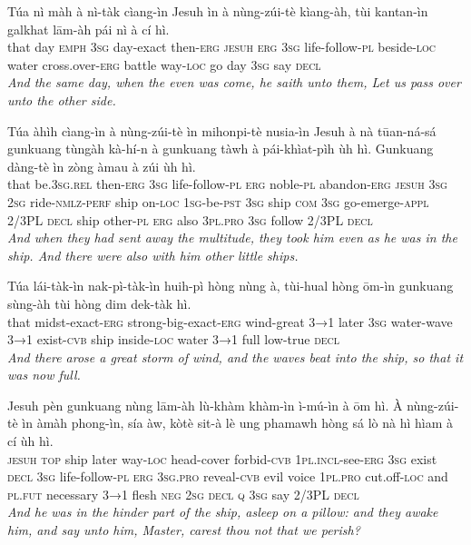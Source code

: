 \documentclass[11pt,a4paper]{article}
\begin{document}
\begin{exe}
\gll Túa nì màh à nì-tàk cìang-ìn Jesuh ìn à nùng-zúi-tè kìang-àh, tùi kantan-ìn galkhat lām-àh pái nì à cí hì. \\
     that day \textsc{emph} \textsc{3sg} day-exact then-\textsc{erg} \textsc{jesuh} \textsc{erg} \textsc{3sg} life-follow-\textsc{pl} beside-\textsc{loc} water cross.over-\textsc{erg} battle way-\textsc{loc} go day \textsc{3sg} say \textsc{decl} \\
\glt \textcolor{kjvcolor}{\textit{And the same day, when the even was come, he saith unto them, Let us pass over unto the other side.}}

\gll Túa àhìh cìang-ìn à nùng-zúi-tè ìn mihonpi-tè nusia-ìn Jesuh à nà tūan-ná-sá gunkuang tùngàh kà-hí-n à gunkuang tàwh à pái-khìat-pìh ùh hì. Gunkuang dàng-tè ìn zòng àmau à zúi ùh hì. \\
     that be.\textsc{3sg}.\textsc{rel} then-\textsc{erg} \textsc{3sg} life-follow-\textsc{pl} \textsc{erg} noble-\textsc{pl} abandon-\textsc{erg} \textsc{jesuh} \textsc{3sg} \textsc{2sg} ride-\textsc{nmlz}-\textsc{perf} ship on-\textsc{loc} \textsc{1sg}-be-\textsc{pst} \textsc{3sg} ship \textsc{com} \textsc{3sg} go-emerge-\textsc{appl} 2/3PL \textsc{decl} ship other-\textsc{pl} \textsc{erg} also \textsc{3pl}.\textsc{pro} \textsc{3sg} follow 2/3PL \textsc{decl} \\
\glt \textcolor{kjvcolor}{\textit{And when they had sent away the multitude, they took him even as he was in the ship. And there were also with him other little ships.}}

\gll Túa lái-tàk-ìn nak-pì-tàk-ìn huih-pì hòng nùng à, tùi-hual hòng ōm-ìn gunkuang sùng-àh tùi hòng dim dek-tàk hì. \\
     that midst-exact-\textsc{erg} strong-big-exact-\textsc{erg} wind-great \textsc{3→1} later \textsc{3sg} water-wave \textsc{3→1} exist-\textsc{cvb} ship inside-\textsc{loc} water \textsc{3→1} full low-true \textsc{decl} \\
\glt \textcolor{kjvcolor}{\textit{And there arose a great storm of wind, and the waves beat into the ship, so that it was now full.}}

\gll Jesuh pèn gunkuang nùng lām-àh lù-khàm khàm-ìn ì-mú-ìn à ōm hì. À nùng-zúi-tè ìn àmàh phong-ìn, sía àw, kòtè sit-à lè ung phamawh hòng sá lò nà hì hìam à cí ùh hì. \\
     \textsc{jesuh} \textsc{top} ship later way-\textsc{loc} head-cover forbid-\textsc{cvb} \textsc{1pl}.\textsc{incl}-see-\textsc{erg} \textsc{3sg} exist \textsc{decl} \textsc{3sg} life-follow-\textsc{pl} \textsc{erg} \textsc{3sg}.\textsc{pro} reveal-\textsc{cvb} evil voice \textsc{1pl}.\textsc{pro} cut.off-\textsc{loc} and \textsc{pl}.\textsc{fut} necessary \textsc{3→1} flesh \textsc{neg} \textsc{2sg} \textsc{decl} \textsc{q} \textsc{3sg} say 2/3PL \textsc{decl} \\
\glt \textcolor{kjvcolor}{\textit{And he was in the hinder part of the ship, asleep on a pillow: and they awake him, and say unto him, Master, carest thou not that we perish?}}


\end{exe}
\end{document}

